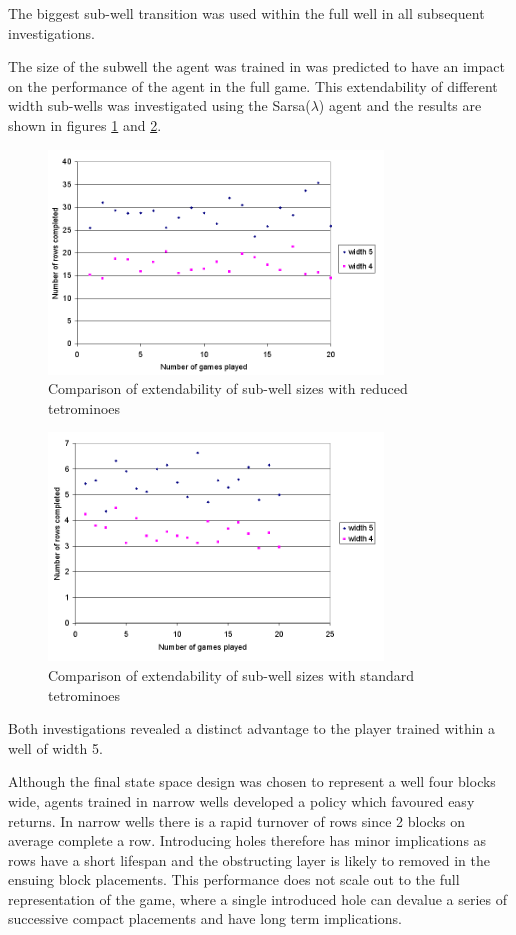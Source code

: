 \documentclass{rucsthesis}
\begin{document}
The biggest sub-well transition was used within the full well in all subsequent investigations. 

The size of the subwell the agent was trained in was predicted to have an impact on the performance of the agent in the full game. This extendability of different width sub-wells was investigated using the Sarsa($\lambda$) agent and the results are shown in figures \ref{fig:widthcomparrison} and \ref{fig:widthcomparrisonfulltet}.

\begin{figure}[h]
\centering
\includegraphics[width=3.5in]{widthcomparrison.png}
\caption{Comparison of extendability of sub-well sizes with reduced tetrominoes}
\label{fig:widthcomparrison}
\end{figure}

\begin{figure}[h]
\centering
\includegraphics[width=3.5in]{widthcomparrisonfulltet.png}
\caption{Comparison of extendability of sub-well sizes with standard tetrominoes}
\label{fig:widthcomparrisonfulltet}
\end{figure}

Both investigations revealed a distinct advantage to the player trained within a well of width 5.

Although the final state space design was chosen to represent a well four blocks wide, agents trained in narrow wells developed a policy which favoured easy returns. In narrow wells there is a rapid turnover of rows since 2 blocks on average complete a row. Introducing holes therefore has minor implications as rows have a short lifespan and the obstructing layer is likely to removed in the ensuing block placements. This performance does not scale out to the full representation of the game, where a single introduced hole can devalue a series of successive compact placements and have long term implications.
\end{document}
